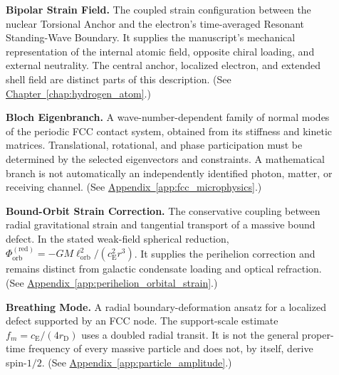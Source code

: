 \begin{description}
\item[] \begin{minipage}[t]{\linewidth}
\textbf{Bipolar Strain Field.} The coupled strain configuration between the nuclear Torsional Anchor and the electron's time-averaged Resonant Standing-Wave Boundary. It supplies the manuscript's mechanical representation of the internal atomic field, opposite chiral loading, and external neutrality. The central anchor, localized electron, and extended shell field are distinct parts of this description.
(See \hyperref[chap:hydrogen_atom]{Chapter~\ref*{chap:hydrogen_atom}}.)
\end{minipage}

\item[] \begin{minipage}[t]{\linewidth}
\textbf{Bloch Eigenbranch.} A wave-number-dependent family of normal modes of the periodic FCC contact system, obtained from its stiffness and kinetic matrices. Translational, rotational, and phase participation must be determined by the selected eigenvectors and constraints. A mathematical branch is not automatically an independently identified photon, matter, or receiving channel.
(See \hyperref[app:fcc_microphysics]{Appendix~\ref*{app:fcc_microphysics}}.)
\end{minipage}

\item[] \begin{minipage}[t]{\linewidth}
\textbf{Bound-Orbit Strain Correction.} The conservative coupling between radial gravitational strain and tangential transport of a massive bound defect. In the stated weak-field spherical reduction, $\Phi_{\mathrm{orb}}^{(\mathrm{red})}=-GM\ell_{\mathrm{orb}}^2/(c_{\mathrm E}^2r^3)$. It supplies the perihelion correction and remains distinct from galactic condensate loading and optical refraction.
(See \hyperref[app:perihelion_orbital_strain]{Appendix~\ref*{app:perihelion_orbital_strain}}.)
\end{minipage}

\item[] \begin{minipage}[t]{\linewidth}
\textbf{Breathing Mode.} A radial boundary-deformation ansatz for a localized defect supported by an FCC node. The support-scale estimate $f_m=c_{\mathrm E}/(4r_{\mathrm D})$ uses a doubled radial transit. It is not the general proper-time frequency of every massive particle and does not, by itself, derive spin-$1/2$.
(See \hyperref[app:particle_amplitude]{Appendix~\ref*{app:particle_amplitude}}.)
\end{minipage}


\end{description}
